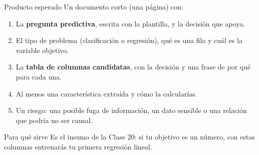 \documentclass[aspectratio=169,11pt]{beamer}
\begin{document}
\begin{frame}[t]{Producto esperado}
  \small
  Un documento corto (una página) con:
  \vspace{0.1cm}
  \begin{enumerate}
    \small
    \item La \textbf{pregunta predictiva}, escrita con la plantilla, y la
      decisión que apoya.
    \item El tipo de problema (clasificación o regresión), qué es una fila y
      cuál es la variable objetivo.
    \item La \textbf{tabla de columnas candidatas}, con la decisión y una
      frase de por qué para cada una.
    \item Al menos una característica extraída y cómo la calcularías.
    \item Un riesgo: una posible fuga de información, un dato sensible o
      una relación que podría no ser causal.
  \end{enumerate}
  \vspace{0.1cm}
  \begin{block}{Para qué sirve}
    \footnotesize Es el insumo de la Clase 20: si tu objetivo es un número,
    con estas columnas entrenarás tu primera regresión lineal.
  \end{block}
\end{frame}

\end{document}
